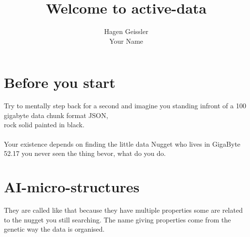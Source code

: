 \documentclass[11pt]{article}
\title{\textbf{Welcome to active-data}}
\author{Hagen Geissler\\
		Your Name}
\date{}
\begin{document}
\maketitle

\section{Before you start}

Try to mentally step back for a second and imagine you standing infront of a 100 gigabyte data chunk format JSON,\\
rock solid painted in black.\\\\
Your existence depends on finding the little data Nugget who lives in GigaByte 52.17 
you never seen the thing bevor,
what do you do. 



\section{AI-micro-structures}
They are called like that because they have multiple properties some are related to the nugget you still searching. The name giving properties come from the genetic way the data is organised.
\end{document}
